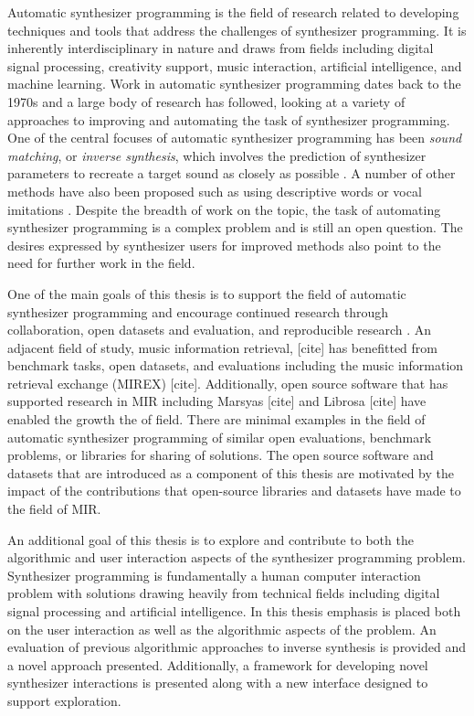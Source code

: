 Automatic synthesizer programming is the field of research related to developing techniques and tools that address the challenges of synthesizer programming. It is inherently interdisciplinary in nature and draws from fields including digital signal processing, creativity support, music interaction, artificial intelligence, and machine learning. Work in automatic synthesizer programming dates back to the 1970s \cite{justice1979analytic} and a large body of research has followed, looking at a variety of approaches to improving and automating the task of synthesizer programming. One of the central focuses of automatic synthesizer programming has been \textit{sound matching}, or \textit{inverse synthesis}, which involves the prediction of synthesizer parameters to recreate a target sound as closely as possible \cite{horner1993machine}. A number of other methods have also been proposed such as using descriptive words \cite{seago2013new} or vocal imitations \cite{cartwright2014synthassist}. Despite the breadth of work on the topic, the task of automating synthesizer programming is a complex problem and is still an open question. The desires expressed by synthesizer users for improved methods also point to the need for further work in the field.

One of the main goals of this thesis is to support the field of automatic synthesizer programming and encourage continued research through collaboration, open datasets and evaluation, and reproducible research \cite{vandewalle2009reproducible}. An adjacent field of study, music information retrieval, [cite] has benefitted from benchmark tasks, open datasets, and evaluations including the music information retrieval exchange (MIREX) [cite]. Additionally, open source software that has supported research in MIR including Marsyas [cite] and Librosa [cite] have enabled the growth the of field. There are minimal examples in the field of automatic synthesizer programming of similar open evaluations, benchmark problems, or libraries for sharing of solutions. The open source software and datasets that are introduced as a component of this thesis are motivated by the impact of the contributions that open-source libraries and datasets have made to the field of MIR.

An additional goal of this thesis is to explore and contribute to both the algorithmic and user interaction aspects of the synthesizer programming problem. Synthesizer programming is fundamentally a human computer interaction problem with solutions drawing heavily from technical fields including digital signal processing and artificial intelligence. In this thesis emphasis is placed both on the user interaction as well as the algorithmic aspects of the problem.  An evaluation of previous algorithmic approaches to inverse synthesis is provided and a novel approach presented. Additionally, a framework for developing novel synthesizer interactions is presented along with a new interface designed to support exploration.

